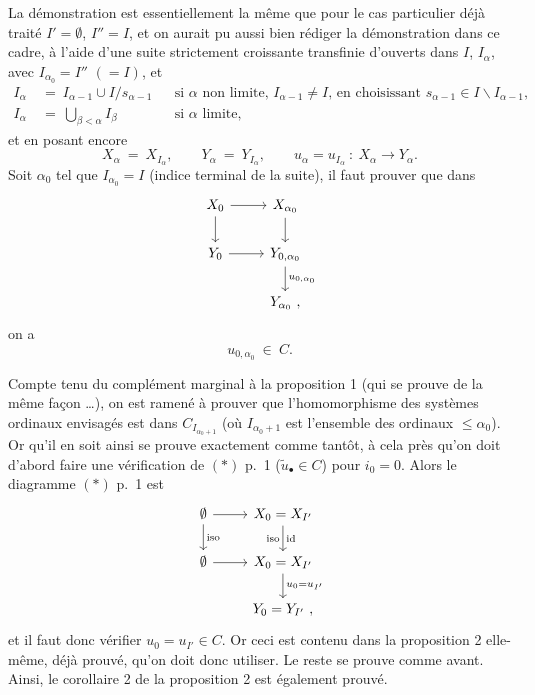 \documentclass[11pt]{article}
\newcommand{\printedpage}[1]{\marginpar{\footnotesize p.~#1}}
\newcommand{\msp}[1]{\marginpar{\footnotesize [#1]}}
\begin{document}
\msp{page 21}
La démonstration est essentiellement la même que pour le cas particulier déjà traité $I' = \emptyset$, $I'' = I$, et on aurait pu aussi bien rédiger la démonstration dans ce cadre, à l'aide d'une suite strictement croissante transfinie d'ouverts dans $I$, $I_\alpha$, avec  $I_{\alpha_0} = I''$ $(= I)$, et
\[
\begin{aligned}
I_\alpha \ &= \ I_{\alpha-1} \cup I/s_{\alpha-1} && \text{si $\alpha$ non limite, $I_{\alpha-1} \neq I$, en choisissant $s_{\alpha-1} \in I \backslash I_{\alpha-1}$,} \\
I_\alpha \ &= \ \textstyle\bigcup_{\beta<\alpha} I_\beta && \text{si $\alpha$ limite,}
\end{aligned}
\]
et en posant encore
\[
X_\alpha \ = \ X_{I_\alpha}, \qquad Y_\alpha \ = \ Y_{I_\alpha}, \qquad u_\alpha = u_{I_\alpha} \ : \ X_\alpha \longrightarrow Y_\alpha.
\]
Soit $\alpha_0$ tel que $I_{\alpha_0} = I$ (indice terminal de la suite), il faut prouver que dans
\[
\begin{tikzcd}
X_0 \arrow[r] \arrow[d] & X_{\alpha_0} \arrow[d] \\
Y_0 \arrow[r] & Y_{0,\alpha_0} \arrow[d, "u_{0,\alpha_0}"] \\
 & Y_{\alpha_0}\ ,
\end{tikzcd}
\]
\printedpage{13}
\msp{page 22} on a
\[
u_{0,\alpha_0} \ \in \ C.
\]

Compte tenu du complément marginal à la proposition 1 (qui se prouve de la même façon \ldots), on est ramené à prouver que l'homomorphisme des systèmes ordinaux envisagés est dans $C_{I_{\alpha_0+1}}$ (où $I_{\alpha_0+1}$ est l'ensemble des ordinaux $\leq \alpha_0$). Or qu'il en soit ainsi se prouve exactement comme tantôt, à cela près qu'on doit d'abord faire une vérification de $(*)$ p.~1 ($\tilde{u}_\bullet \in C$) pour $i_0 = 0$. Alors le diagramme $(*)$ p.~1 est
\[
\begin{tikzcd}
\emptyset \arrow[r] \arrow[d, "\mathrm{iso}"] & X_0 = X_{I'} \arrow[d, "\mathrm{iso}"', "\mathrm{id}"] \\
\emptyset \arrow[r] & X_0 = X_{I'} \arrow[d, "u_0 = u_{I'}"] \\
 & Y_0 = Y_{I'}\ ,
\end{tikzcd}
\]
et il faut donc vérifier $u_0 = u_{I'} \in C$. Or ceci est contenu dans la proposition 2 elle-même, déjà prouvé, qu'on doit donc utiliser. %
Le reste se prouve comme avant. Ainsi, le corollaire 2 de la proposition 2 est également prouvé.
\end{document}
